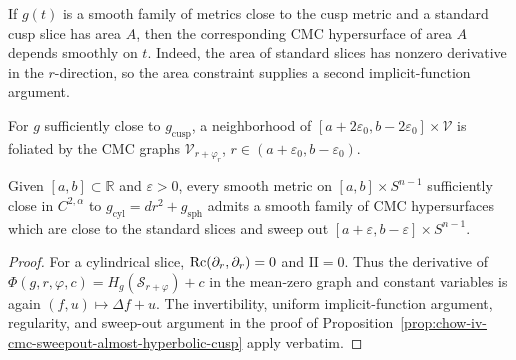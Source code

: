\begin{remark}
\label{rem:chow-iv-cmc-fixed-area-smooth-dependence}


If \(g(t)\) is a smooth family of metrics close to the cusp metric and a
standard cusp slice has area \(A\), then the corresponding CMC hypersurface of
area \(A\) depends smoothly on \(t\).  Indeed, the area of standard slices has
nonzero derivative in the \(r\)-direction, so the area constraint supplies a
second implicit-function argument.
\end{remark}

\begin{claim}
\label{clm:chow-iv-cmc-cusp-graphs-foliate}


For \(g\) sufficiently close to \(g_{\mathrm{cusp}}\), a neighborhood of
\([a+2\varepsilon_0,b-2\varepsilon_0]\times\mathcal V\) is foliated by the
CMC graphs \(\mathcal V_{r+\varphi_r}\),
\(r\in(a+\varepsilon_0,b-\varepsilon_0)\).
\end{claim}

\begin{proposition}
\label{prop:chow-iv-cmc-spheres-almost-cylindrical-neck}


Given \([a,b]\subset\mathbb R\) and \(\varepsilon>0\), every smooth metric on
\([a,b]\times S^{n-1}\) sufficiently close in \(C^{2,\alpha}\) to
\(g_{\mathrm{cyl}}=dr^2+g_{\mathrm{sph}}\) admits a smooth family of CMC
hypersurfaces which are close to the standard slices and sweep out
\([a+\varepsilon,b-\varepsilon]\times S^{n-1}\).
\end{proposition}
\begin{proof}
\sketch
For a cylindrical slice, \(\operatorname{Rc}(\partial_r,\partial_r)=0\) and
\(\mathrm{II}=0\).  Thus the derivative of
\(\Phi(g,r,\varphi,c)=H_g(\mathcal S_{r+\varphi})+c\) in the mean-zero graph
and constant variables is again \((f,u)\mapsto\Delta f+u\).  The invertibility,
uniform implicit-function argument, regularity, and sweep-out argument in the
proof of Proposition~\ref{prop:chow-iv-cmc-sweepout-almost-hyperbolic-cusp}
apply verbatim.
\end{proof}

